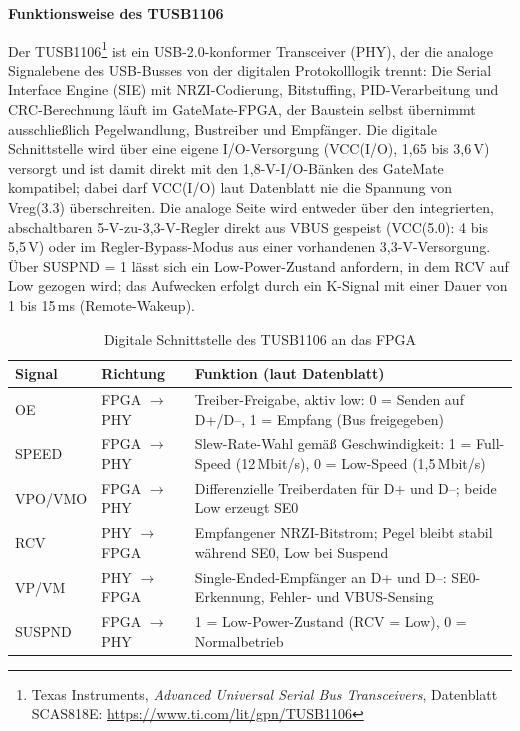 \documentclass[a4paper,11pt]{article}
\begin{document}
\textbf{Funktionsweise des TUSB1106}

Der TUSB1106\footnote{Texas Instruments, \textit{Advanced Universal Serial Bus Transceivers}, Datenblatt SCAS818E: \url{https://www.ti.com/lit/gpn/TUSB1106}} ist ein USB-2.0-konformer Transceiver (PHY), der die analoge Signalebene des USB-Busses von der digitalen Protokolllogik trennt: Die Serial Interface Engine (SIE) mit NRZI-Codierung, Bitstuffing, PID-Verarbeitung und CRC-Berechnung läuft im GateMate-FPGA, der Baustein selbst übernimmt ausschließlich Pegelwandlung, Bustreiber und Empfänger. Die digitale Schnittstelle wird über eine eigene I/O-Versorgung (VCC(I/O), 1,65 bis 3,6\,V) versorgt und ist damit direkt mit den 1,8-V-I/O-Bänken des GateMate kompatibel; dabei darf VCC(I/O) laut Datenblatt nie die Spannung von Vreg(3.3) überschreiten. Die analoge Seite wird entweder über den integrierten, abschaltbaren 5-V-zu-3,3-V-Regler direkt aus VBUS gespeist (VCC(5.0): 4 bis 5,5\,V) oder im Regler-Bypass-Modus aus einer vorhandenen 3,3-V-Versorgung. Über SUSPND = 1 lässt sich ein Low-Power-Zustand anfordern, in dem RCV auf Low gezogen wird; das Aufwecken erfolgt durch ein K-Signal mit einer Dauer von 1 bis 15\,ms (Remote-Wakeup).

\begin{table}[H]
	\centering
	\begin{tabular}{|l|l|p{8.2cm}|}
		\hline
		\textbf{Signal} & \textbf{Richtung}      & \textbf{Funktion (laut Datenblatt)}                                                            \\ \hline
		OE              & FPGA $\rightarrow$ PHY & Treiber-Freigabe, aktiv low: 0 = Senden auf D+/D--, 1 = Empfang (Bus freigegeben)              \\ \hline
		SPEED           & FPGA $\rightarrow$ PHY & Slew-Rate-Wahl gemäß Geschwindigkeit: 1 = Full-Speed (12\,Mbit/s), 0 = Low-Speed (1,5\,Mbit/s) \\ \hline
		VPO/VMO         & FPGA $\rightarrow$ PHY & Differenzielle Treiberdaten für D+ und D--; beide Low erzeugt SE0                              \\ \hline
		RCV             & PHY $\rightarrow$ FPGA & Empfangener NRZI-Bitstrom; Pegel bleibt stabil während SE0, Low bei Suspend                    \\ \hline
		VP/VM           & PHY $\rightarrow$ FPGA & Single-Ended-Empfänger an D+ und D--: SE0-Erkennung, Fehler- und VBUS-Sensing                  \\ \hline
		SUSPND          & FPGA $\rightarrow$ PHY & 1 = Low-Power-Zustand (RCV = Low), 0 = Normalbetrieb                                           \\ \hline
	\end{tabular}
	\caption{Digitale Schnittstelle des TUSB1106 an das FPGA}
	\label{tab:tusb_signals}
\end{table}
\end{document}
